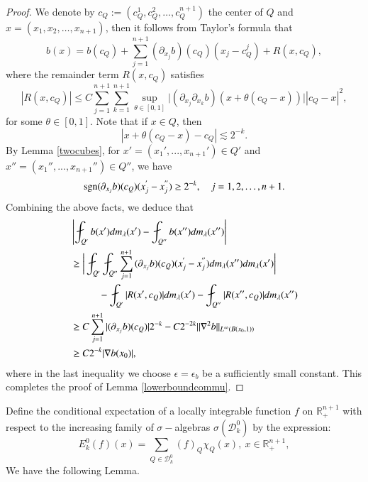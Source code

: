 \documentclass[12pt]{amsart}
\begin{document}
\begin{proof}
We denote by $c_Q := (c_Q^1,c_Q^2,\ldots,c_Q^{n+1})$ the center of $Q$ and $x = (x_1, x_2,\ldots,x_{n+1})$, then it follows from Taylor's formula that
\begin{equation}\label{usetay}
 b(x) = b(c_Q) + \sum_{j=1}^{n+1}{(\partial_{x_j}b)(c_Q)}(x_j-c_{Q}^j) + R(x,c_Q),
\end{equation}
where the remainder term $R(x,c_Q)$ satisfies
\begin{equation}\label{laste}
 |R(x,c_Q)|\leq C\sum_{j=1}^{n+1}\sum_{k=1}^{n+1} \sup_{\theta\in[0,1]}\big|(\partial_{x_j}\partial_{x_k}b)(x+\theta(c_Q-x))\big| |c_Q - x|^{2},
\end{equation}
for some $\theta\in[0,1]$. Note that if $x\in Q$, then
$$|x+\theta(c_Q-x)-c_Q|\lesssim 2^{-k}.$$
By  Lemma \ref{twocubes}, for $x'=(x_1',...,x_{n+1}')\in Q'$ and $x''=(x_{1}'',...,x_{n+1}'')\in Q''$, we have
\begin{equation*}
    {\rm sgn}(\partial_{x_j}b)(c_Q)(x_j^{'}-x_j^{''})\geq 2^{-k}, \quad j=1,2,\ldots,n+1.
\end{equation*}
Combining the above facts, we deduce that
\begin{align*}
&\left|\fint_{Q'}b(x')dm_\lambda(x') -\fint_{Q''}b(x'')dm_\lambda(x'')\right|\\ & \geq  \bigg|\fint_{Q'}\fint_{Q''}\sum_{j=1}^{n+1}{(\partial_{x_j}b)(c_Q)}(x_j^{'}-x_j^{''})dm_\lambda(x'')dm_\lambda(x')\bigg| \\
&\hspace{1.0cm}- \fint_{Q'}|R(x',c_Q)|dm_\lambda(x') - \fint_{Q''}|R(x'',c_Q)|dm_\lambda(x'')  \\&\geq C\sum_{j=1}^{n+1}|(\partial_{x_j}b)(c_Q)|2^{-k} -C2^{-2k}\|\nabla^2 b\|_{L^\infty(B(x_0,1))}\\
&\geq C2^{-k} |\nabla b(x_0)|,
\end{align*}
where in the last inequality we choose $\epsilon=\epsilon_b$ be a sufficiently small constant. This completes the proof of Lemma \ref{lowerboundcommu}.
\end{proof}

Define the conditional expectation of a locally integrable function $f$ on $\mathbb{R}_+^{n+1}$  with respect to the increasing family of $\sigma-$algebras $\sigma(\mathcal{D}_{k}^0)$   by the expression:
$$E_{k}^0(f)(x)=\sum_{Q\in \mathcal{D}_{k}^0}(f)_{Q}\chi_{Q}(x),\ x\in\mathbb{R}_+^{n+1},$$
We have the following Lemma.
\end{document}
